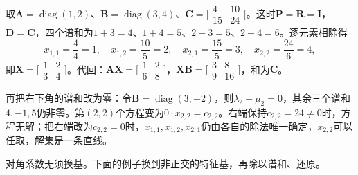 \begin{example}[对角系数下的逐元素相除与零谱和]
\label{ex:ls-sylvester-diagonal-zero-sum}
取$\bm A=\operatorname{diag}(1,2)$、$\bm B=\operatorname{diag}(3,4)$、$\bm C=\bigl[\begin{smallmatrix}4&10\\15&24\end{smallmatrix}\bigr]$。这时$\bm P=\bm R=\bm I$，$\bm D=\bm C$，四个谱和为$1+3=4$、$1+4=5$、$2+3=5$、$2+4=6$。逐元素相除得
\[
 x_{1,1}=\frac44=1,\quad x_{1,2}=\frac{10}5=2,\quad
 x_{2,1}=\frac{15}5=3,\quad x_{2,2}=\frac{24}6=4,
\]
即$\bm X=\bigl[\begin{smallmatrix}1&2\\3&4\end{smallmatrix}\bigr]$。代回：$\bm A\bm X=\bigl[\begin{smallmatrix}1&2\\6&8\end{smallmatrix}\bigr]$，$\bm X\bm B=\bigl[\begin{smallmatrix}3&8\\9&16\end{smallmatrix}\bigr]$，和为$\bm C$。

再把右下角的谱和改为零：令$\bm B=\operatorname{diag}(3,-2)$，则$\lambda_2+\mu_2=0$，其余三个谱和$4,-1,5$仍非零。第$(2,2)$个方程变为$0\cdot x_{2,2}=c_{2,2}$。右端保持$c_{2,2}=24\neq0$时，方程无解；把右端改为$c_{2,2}=0$时，$x_{1,1},x_{1,2},x_{2,1}$仍由各自的除法唯一确定，$x_{2,2}$可以任取，解集是一条直线。
\end{example}

对角系数无须换基。下面的例子换到非正交的特征基，再除以谱和、还原。

